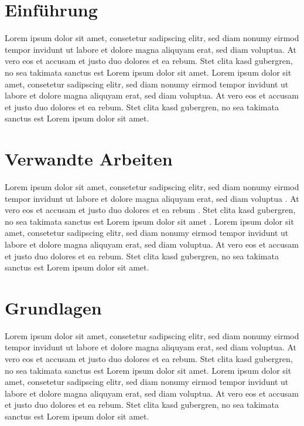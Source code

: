 
\section{Einführung}

Lorem ipsum dolor sit amet, consetetur sadipscing elitr, sed diam nonumy eirmod tempor invidunt ut labore et dolore magna aliquyam erat, sed diam voluptua. At vero eos et accusam et justo duo dolores et ea rebum. Stet clita kasd gubergren, no sea takimata sanctus est Lorem ipsum dolor sit amet. Lorem ipsum dolor sit amet, consetetur sadipscing elitr, sed diam nonumy eirmod tempor invidunt ut labore et dolore magna aliquyam erat, sed diam voluptua. At vero eos et accusam et justo duo dolores et ea rebum. Stet clita kasd gubergren, no sea takimata sanctus est Lorem ipsum dolor sit amet.


\section{Verwandte Arbeiten}

Lorem ipsum dolor sit amet, consetetur sadipscing elitr, sed diam nonumy eirmod tempor invidunt ut labore et dolore magna aliquyam erat, sed diam voluptua \cite{ochmann-2014}. At vero eos et accusam et justo duo dolores et ea rebum \cite{ochmann-2014-towards}. Stet clita kasd gubergren, no sea takimata sanctus est Lorem ipsum dolor sit amet \cite{Ochmann-2015-Automatic}. Lorem ipsum dolor sit amet, consetetur sadipscing elitr, sed diam nonumy eirmod tempor invidunt ut labore et dolore magna aliquyam erat, sed diam voluptua. At vero eos et accusam et justo duo dolores et ea rebum. Stet clita kasd gubergren, no sea takimata sanctus est Lorem ipsum dolor sit amet.


\section{Grundlagen}

Lorem ipsum dolor sit amet, consetetur sadipscing elitr, sed diam nonumy eirmod tempor invidunt ut labore et dolore magna aliquyam erat, sed diam voluptua. At vero eos et accusam et justo duo dolores et ea rebum. Stet clita kasd gubergren, no sea takimata sanctus est Lorem ipsum dolor sit amet. Lorem ipsum dolor sit amet, consetetur sadipscing elitr, sed diam nonumy eirmod tempor invidunt ut labore et dolore magna aliquyam erat, sed diam voluptua. At vero eos et accusam et justo duo dolores et ea rebum. Stet clita kasd gubergren, no sea takimata sanctus est Lorem ipsum dolor sit amet.

